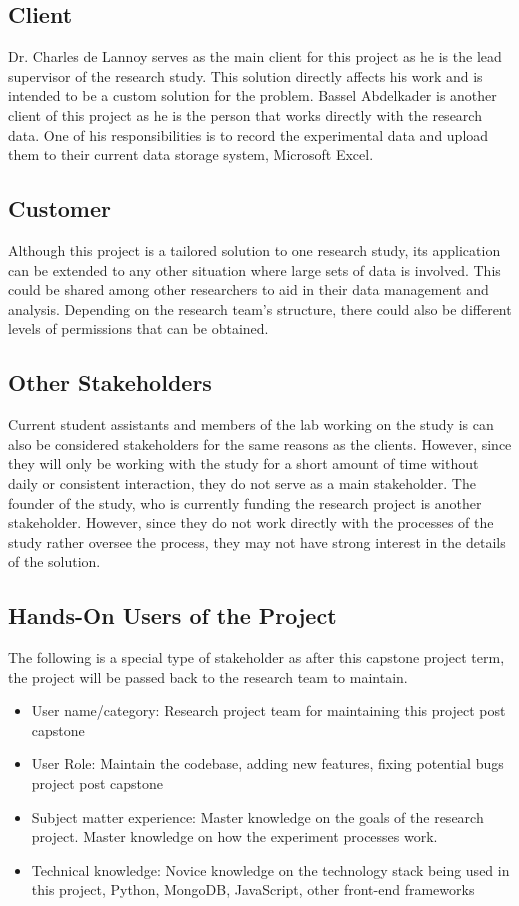 \documentclass[12pt]{article}
\begin{document}
\subsection{Client}
Dr. Charles de Lannoy serves as the main client for this project as he is the
lead supervisor of the research study. This solution directly affects his work and
is intended to be a custom solution for the problem. Bassel Abdelkader is
another client of this project as he is the person that works directly with the
research data. One of his responsibilities is to record the experimental data and
upload them to their current data storage system, Microsoft Excel. 
\subsection{Customer}
Although this project is a tailored solution to one research study, its
application can be extended to any other situation where large sets of data is
involved. This could be shared among other researchers to aid in their data
management and analysis. Depending on the research team's structure, there could
also be different levels of permissions that can be obtained.
\subsection{Other Stakeholders}
Current student assistants and members of the lab working on the study is can also be
considered stakeholders for the same reasons as the clients. However, since they
will only be working with the study for a short amount of time without daily or
consistent interaction, they do not serve as a main stakeholder. The founder of
the study, who is currently funding the research project is another stakeholder.
However, since they do not work directly with the processes of the study rather
oversee the process, they may not have strong interest in the details of the solution. 
\subsection{Hands-On Users of the Project}
\label{sec:2.4}
The following is a special type of stakeholder as after this capstone project
term, the project will be passed back to the research team to maintain. 
\begin{itemize}
  \item User name/category: Research project team for maintaining this project post capstone 
  \item User Role: Maintain the codebase, adding new features, fixing potential bugs
  project post capstone
  \item Subject matter experience: Master knowledge on the goals of the research
  project. Master knowledge on how the experiment processes work. 
  \item Technical knowledge: Novice knowledge on the technology stack being
  used in this project, Python, MongoDB, JavaScript, other front-end frameworks 
\end{itemize}
\end{document}
